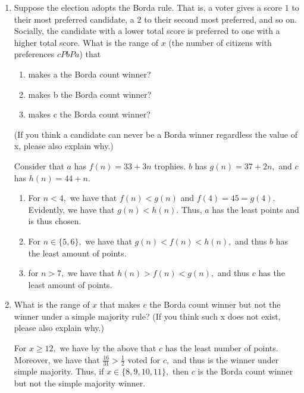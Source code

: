 \documentclass[11pt]{article}
\begin{document}
\begin{enumerate}
\item
\begin{problem}
        Suppose the election adopts the Borda rule. That is, a voter gives a score $1$ to their most preferred candidate, a $2$ to their second most preferred, and so on. Socially, the candidate with a lower total score is preferred to one with a higher total score. What
is the range of $x$ (the number of citizens with preferences $c P b P a$) that
\begin{enumerate}
\item makes a the Borda count winner?
\item makes b the Borda count winner?
\item makes c the Borda count winner?
\end{enumerate}
(If you think a candidate can never be a Borda winner regardless the value of x, please
also explain why.)
\end{problem}
\begin{solution}
Consider that $a$ has $f(n) = 33 + 3n$ trophies. $b$ has $g(n) = 37 + 2n,$ and $c$ has $h(n) = 44 + n.$
    \begin{enumerate}
        \item For $n<4,$ we have that $f(n) <g(n)$ and  $f(4) = 45 = g(4).$ Evidently, we have that $g(n)< h(n).$ Thus, $a$ has the least points and is thus chosen.
        \item For $n \in \{5,6\},$ we have that $g(n)< f(n)< h(n),$ and thus $b$ has the least amount of points.
        \item for $n>7,$ we have that $h(n)> f(n)< g(n),$ and thus $c$ has the least amount of points.
    \end{enumerate}
\end{solution}
\item 
\begin{problem}
    What is the range of $x$ that makes $c$ the Borda count winner but not the winner under a simple majority rule? (If you think such x does not exist, please also
explain why.)
\end{problem}
\begin{solution}
    For $x\geq 12,$ we have by the above that $c$ has the least number of points. Moreover, we have that $\frac{16}{31}> \frac{1}{2}$ voted for $c,$ and thus is the winner under simple majority. Thus, if $x \in \{8,9,10,11\},$ then $c$ is the Borda count winner but not the simple majority winner.
\end{solution}
\end{enumerate}
\end{document}
